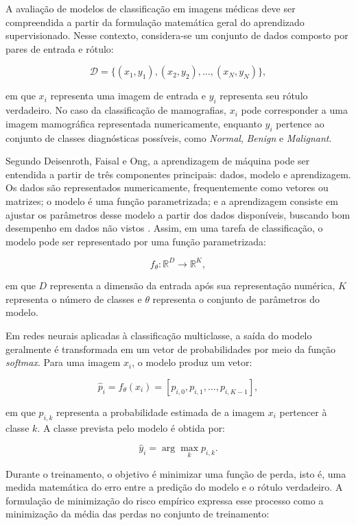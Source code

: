\documentclass[
    12pt,
    openright,
    oneside,
    a4paper,
    english,
    brazil
]{abntex2}
\begin{document}
A avaliação de modelos de classificação em imagens médicas deve ser compreendida a partir da formulação matemática geral do aprendizado supervisionado. Nesse contexto, considera-se um conjunto de dados composto por pares de entrada e rótulo:

\[
\mathcal{D} = \{(x_1,y_1),(x_2,y_2),\ldots,(x_N,y_N)\},
\]

em que \(x_i\) representa uma imagem de entrada e \(y_i\) representa seu rótulo verdadeiro. No caso da classificação de mamografias, \(x_i\) pode corresponder a uma imagem mamográfica representada numericamente, enquanto \(y_i\) pertence ao conjunto de classes diagnósticas possíveis, como \textit{Normal}, \textit{Benign} e \textit{Malignant}.

Segundo Deisenroth, Faisal e Ong, a aprendizagem de máquina pode ser entendida a partir de três componentes principais: dados, modelo e aprendizagem. Os dados são representados numericamente, frequentemente como vetores ou matrizes; o modelo é uma função parametrizada; e a aprendizagem consiste em ajustar os parâmetros desse modelo a partir dos dados disponíveis, buscando bom desempenho em dados não vistos \cite{deisenroth2020mathematics}. Assim, em uma tarefa de classificação, o modelo pode ser representado por uma função parametrizada:

\[
f_{\theta}: \mathbb{R}^{D} \rightarrow \mathbb{R}^{K},
\]

em que \(D\) representa a dimensão da entrada após sua representação numérica, \(K\) representa o número de classes e \(\theta\) representa o conjunto de parâmetros do modelo.

Em redes neurais aplicadas à classificação multiclasse, a saída do modelo geralmente é transformada em um vetor de probabilidades por meio da função \textit{softmax}. Para uma imagem \(x_i\), o modelo produz um vetor:

\[
\hat{p}_i = f_{\theta}(x_i) = [p_{i,0}, p_{i,1}, \ldots, p_{i,K-1}],
\]

em que \(p_{i,k}\) representa a probabilidade estimada de a imagem \(x_i\) pertencer à classe \(k\). A classe prevista pelo modelo é obtida por:

\[
\hat{y}_i = \arg\max_{k} p_{i,k}.
\]

Durante o treinamento, o objetivo é minimizar uma função de perda, isto é, uma medida matemática do erro entre a predição do modelo e o rótulo verdadeiro. A formulação de minimização do risco empírico expressa esse processo como a minimização da média das perdas no conjunto de treinamento:
\end{document}
